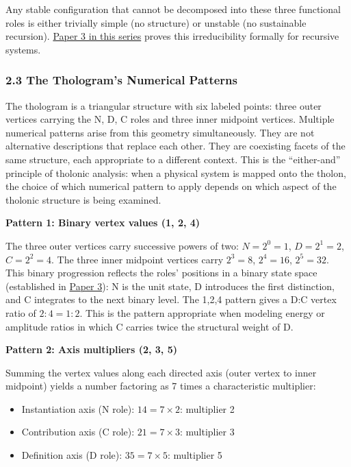 \documentclass[
  11pt,
  letterpaper,
]{article}
\providecommand{\tightlist}{%
  \setlength{\itemsep}{0pt}\setlength{\parskip}{0pt}}
\begin{document}
Any stable configuration that cannot be decomposed into these three
functional roles is either trivially simple (no structure) or unstable
(no sustainable recursion).
\href{https://github.com/baardev/truevalue/blob/main/docnav/Research/papers/3_minimal-recursive-triadic-framework/3_minimal-recursive-triadic-framework.pdf}{Paper
3 in this series} proves this irreducibility formally for recursive
systems.

\subsubsection{2.3 The Thologram's Numerical
Patterns}\label{the-tholograms-numerical-patterns}

The thologram is a triangular structure with six labeled points: three
outer vertices carrying the N, D, C roles and three inner midpoint
vertices. Multiple numerical patterns arise from this geometry
simultaneously. They are not alternative descriptions that replace each
other. They are coexisting facets of the same structure, each
appropriate to a different context. This is the ``either-and'' principle
of tholonic analysis: when a physical system is mapped onto the tholon,
the choice of which numerical pattern to apply depends on which aspect
of the tholonic structure is being examined.

\textbf{Pattern 1: Binary vertex values (1, 2, 4)}

The three outer vertices carry successive powers of two:
\(N = 2^0 = 1\), \(D = 2^1 = 2\), \(C = 2^2 = 4\). The three inner
midpoint vertices carry \(2^3 = 8\), \(2^4 = 16\), \(2^5 = 32\). This
binary progression reflects the roles' positions in a binary state space
(established in
\href{https://github.com/baardev/truevalue/blob/main/docnav/Research/papers/3_minimal-recursive-triadic-framework/3_minimal-recursive-triadic-framework.pdf}{Paper
3}): N is the unit state, D introduces the first distinction, and C
integrates to the next binary level. The 1,2,4 pattern gives a D:C
vertex ratio of \(2:4 = 1:2\). This is the pattern appropriate when
modeling energy or amplitude ratios in which C carries twice the
structural weight of D.

\textbf{Pattern 2: Axis multipliers (2, 3, 5)}

Summing the vertex values along each directed axis (outer vertex to
inner midpoint) yields a number factoring as 7 times a characteristic
multiplier:

\begin{itemize}
\tightlist
\item
  Instantiation axis (N role): \(14 = 7 \times 2\): multiplier 2
\item
  Contribution axis (C role): \(21 = 7 \times 3\): multiplier 3
\item
  Definition axis (D role): \(35 = 7 \times 5\): multiplier 5
\end{itemize}
\end{document}
